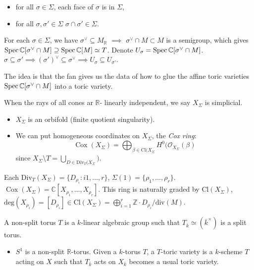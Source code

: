 \begin{itemize}
\item for all $\sigma \in \Sigma$,
each face of $\sigma$ is in $\Sigma$,
\item for all $\sigma,\sigma' \in \Sigma$
$\sigma \cap \sigma' \in \Sigma$.
\end{itemize}

\noindent
For each $\sigma \in \Sigma$, we have
$\sigma^\vee \subseteq M_{\mathbb{R}}$
$\implies $ $\sigma^\vee \cap M \subset M$
is a semigroup, which gives
$\mathop{\mathrm{Spec}} \mathbb{C}[\sigma^\vee\cap M]
\supseteq \mathop{\mathrm{Spec}} \mathbb{C}[M]
\simeq T$.
Denote $U_\sigma = \mathop{\mathrm{Spec}}
\mathbb{C}[\sigma^\vee \cap M]$.
$\sigma \subseteq \sigma' \implies
(\sigma')^\vee \subseteq \sigma^\vee \implies 
U_\sigma \subseteq U_{\sigma'}$.

The idea is that the fan gives us the data
of how to glue the affine toric varieties
$\mathop{\mathrm{Spec}} \mathbb{C}[\sigma^\vee \cap M]$
into a toric variety.

When the rays of all cones ar $\mathbb{R}$-
linearly independent, we say
$X_{\Sigma}$ is simplicial.
\begin{itemize}
\item $X_\Sigma$ is an orbifold
(finite quotient singularity).
\item We can put homogeneous coordinates
on $X_{\Sigma}$, the {\it Cox ring}:
$$
\operatorname{Cox}(X_{\Sigma})
= \bigoplus_{\beta \in \text{Cl}(X_{\Sigma}}
H^0(\mathcal{O}_{X_{\Sigma}}(\beta)
$$
since $X_{\Sigma}\setminus T
= \bigcup_{D \in
\text{Div}_{T}(X_{\Sigma}})$.
\end{itemize}

\noindent
Each $\text{Div}_T(X_{\Sigma})
=\{D_{\rho_i}:i 1,…,r\}$,
$\Sigma(1)= \{\rho_1,…,\rho_r\}$.
$\operatorname{Cox}(X_{\Sigma})
=\mathbb{C}[X_{\rho_1},…,X_{\rho_r}]$.
This ring is naturally graded by
$\text{Cl}(X_{\Sigma})$,
$\text{deg}(X_{\rho_i})=
[D_{\rho_i}] \in \text{Cl}(X_{\Sigma})
=\bigoplus_{i=1}^r \mathbb{Z}\cdot
D_{\rho_i}/\text{div}(M)$.

A non-split torus $T$ is a $k$-linear
algebraic group such that
$T_{\overline{k}}\simeq
(\overline{k}^\times)$ is a split torus.

\begin{itemize}
\item $S^1$ is a non-split
$\mathbb{R}$-torus.
Given a $k$-torus $T$, a $T$-toric
variety is a $k$-scheme $T$ acting on $X$
such that $T_{\overline{k}}$ acts on
$X_{\overline{k}}$ becomes a usual
toric variety.
\end{itemize}

